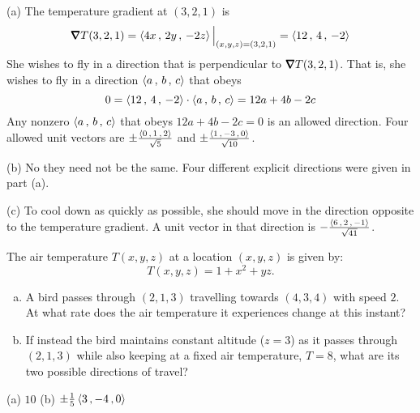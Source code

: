 \begin{solution}
(a) The temperature gradient at $(3,2,1)$ is
\begin{align*}
\vnabla T(3,2,1) = \llt 4x\,,\,2y\,,\,-2z\rgt\Big|_{(x,y,z)=(3,2,1)}
                 = \llt 12\,,\,4\,,\,-2\rgt
\end{align*}
She wishes to fly in a direction that is perpendicular to $\vnabla T(3,2,1)$.
That is, she wishes to fly in a direction $\left< a\,,\,b\,,\,c\right>$
that obeys
\begin{equation*}
0 = \left< 12\,,\,4\,,\,-2\right>\cdot \left< a\,,\,b\,,\,c\right>
  = 12a+4b-2c
\end{equation*}
Any nonzero $\left< a\,,\,b\,,\,c\right>$ that obeys $12a+4b-2c=0$
is an allowed direction. Four allowed unit vectors are
$\pm\frac{\left< 0\,,\,1\,,\,2\right>}{\sqrt{5}}$ and
$\pm\frac{\left< 1\,,\,-3\,,\,0\right>}{\sqrt{10}}$.

(b) No they need not be the same. Four different explicit directions
     were given in part (a).

(c) To cool down as quickly as possible, she should move in the direction
    opposite to the temperature gradient. A unit vector in that direction is 
    $-\frac{\left< 6\,,\,2\,,\,-1\right>}{\sqrt{41}}$.
\end{solution}

\begin{question}[M200 2008D] %

\end{question}
The air temperature $T(x,y,z)$ at a location $(x,y,z)$ is given by:
\begin{equation*}
T(x,y,z) = 1 + x^2 + yz.
\end{equation*}
\begin{enumerate}[(a)]
\item
A bird passes through $(2,1,3)$ travelling towards $(4,3,4)$ with speed $2$.
At what rate does the air temperature it experiences change at this instant?

\item
If instead the bird maintains constant altitude ($z = 3$) as it passes
through $(2,1,3)$ while also keeping at a fixed air temperature, $T = 8$, 
what are its two possible directions of travel?
\end{enumerate}
%

\begin{answer}
(a) $10$\qquad
(b) $\pm \frac{1}{5}\left< 3\,,-4\,,0\right>$
\end{answer}

